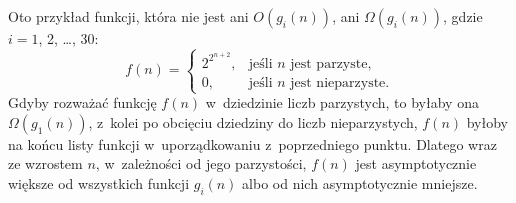 \subproblem %
Oto przykład funkcji, która nie jest ani $O(g_i(n))$, ani $\Omega(g_i(n))$, gdzie $i=1$, 2, \dots, 30:
\[
	f(n) =
	\begin{cases}
		2^{2^{n+2}}, & \text{jeśli $n$ jest parzyste}, \\
		0, & \text{jeśli $n$ jest nieparzyste}.
	\end{cases}
\]
Gdyby rozważać funkcję $f(n)$ w~dziedzinie liczb parzystych, to byłaby ona $\Omega(g_1(n))$, z~kolei po obcięciu dziedziny do liczb nieparzystych, $f(n)$ byłoby na końcu listy funkcji w~uporządkowaniu z~poprzedniego punktu.
Dlatego wraz ze wzrostem $n$, w~zależności od jego parzystości, $f(n)$ jest asymptotycznie większe od wszystkich funkcji $g_i(n)$ albo od nich asymptotycznie mniejsze.
